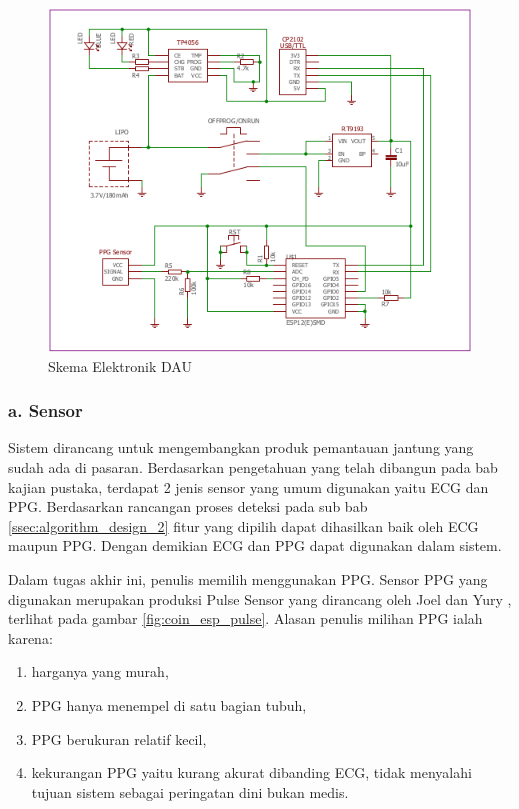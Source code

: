 \begin{figure}[H]
\centering
\includegraphics[scale=0.7]{images/schematics.png}
\caption{Skema Elektronik DAU}
\label{fig:schematics}
\end{figure}

\subsubsection{a. Sensor}
Sistem dirancang untuk mengembangkan produk pemantauan jantung yang sudah ada di pasaran. Berdasarkan pengetahuan yang telah dibangun pada bab kajian pustaka, terdapat 2 jenis sensor yang umum digunakan yaitu ECG dan PPG. Berdasarkan rancangan proses deteksi pada sub bab \ref{ssec:algorithm_design_2} fitur yang dipilih dapat dihasilkan baik oleh ECG maupun PPG. Dengan demikian ECG dan PPG dapat digunakan dalam sistem.

Dalam tugas akhir ini, penulis memilih menggunakan PPG. Sensor PPG yang digunakan merupakan produksi Pulse Sensor yang dirancang oleh Joel dan Yury \cite{pulse_sensor}, terlihat pada gambar \ref{fig:coin_esp_pulse}. Alasan penulis milihan PPG ialah karena:
\begin{enumerate}
	\item harganya yang murah,
	\item PPG hanya menempel di satu bagian tubuh,
	\item PPG berukuran relatif kecil,
	\item kekurangan PPG yaitu kurang akurat dibanding ECG, tidak menyalahi tujuan sistem sebagai peringatan dini bukan medis.
\end{enumerate}

